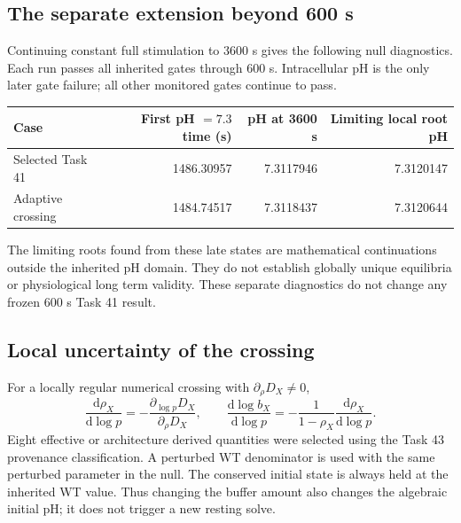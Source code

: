 \subsection{The separate extension beyond 600 s}
Continuing constant full stimulation to 3600 s gives the following null
diagnostics. Each run passes all inherited gates through 600 s. Intracellular
pH is the only later gate failure; all other monitored gates continue to pass.
\begin{center}
\begin{tabular}{lrrr}
\hline
Case & First pH $=7.3$ time (s) & pH at 3600 s & Limiting local root pH \\
\hline
Selected Task 41 & 1486.30957 & 7.3117946 & 7.3120147 \\
Adaptive crossing & 1484.74517 & 7.3118437 & 7.3120644 \\
\hline
\end{tabular}
\end{center}
The limiting roots found from these late states are mathematical continuations
outside the inherited pH domain. They do not establish globally unique
equilibria or physiological long term validity. These separate diagnostics do
not change any frozen 600 s Task 41 result.

\subsection{Local uncertainty of the crossing}
For a locally regular numerical crossing with $\partial_\rho D_X\ne0$,
\begin{equation}
 \frac{\mathrm d\rho_X}{\mathrm d\log p}
 =-\frac{\partial_{\log p}D_X}{\partial_\rho D_X},\qquad
 \frac{\mathrm d\log b_X}{\mathrm d\log p}
 =-\frac{1}{1-\rho_X}\frac{\mathrm d\rho_X}{\mathrm d\log p}.
 \label{eq:thresholdsensitivity}
\end{equation}
Eight effective or architecture derived quantities were selected using the
Task 43 provenance classification. A perturbed WT denominator is used with
the same perturbed parameter in the null. The conserved initial state is
always held at the inherited WT value. Thus changing the buffer amount also
changes the algebraic initial pH; it does not trigger a new resting solve.

